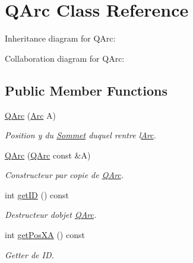 \hypertarget{classQArc}{}\section{Q\+Arc Class Reference}
\label{classQArc}


Inheritance diagram for Q\+Arc\+:


Collaboration diagram for Q\+Arc\+:
\subsection*{Public Member Functions}
\begin{DoxyCompactItemize}
\item 
\hyperlink{classQArc_af544f4b00272253a41bc7e6a927bc30c}{Q\+Arc} (\hyperlink{classArc}{Arc} A)
\begin{DoxyCompactList}\small\item\em Position y du \hyperlink{classSommet}{Sommet} duquel rentre l\textquotesingle{}\hyperlink{classArc}{Arc}. \end{DoxyCompactList}\item 
\hyperlink{classQArc_a6eec002d8041a3fca057a7364cefae85}{Q\+Arc} (\hyperlink{classQArc}{Q\+Arc} const \&A)
\begin{DoxyCompactList}\small\item\em Constructeur par copie de \hyperlink{classQArc}{Q\+Arc}. \end{DoxyCompactList}\item 
\mbox{\label{classQArc_a1dd2f3fe97ac5453f40651a1431468c2}} 
int \hyperlink{classQArc_a1dd2f3fe97ac5453f40651a1431468c2}{get\+ID} () const
\begin{DoxyCompactList}\small\item\em Destructeur d\textquotesingle{}objet \hyperlink{classQArc}{Q\+Arc}. \end{DoxyCompactList}\item 
\mbox{\label{classQArc_aa8e171b97d1e1dbecfd558f6872f8354}} 
int \hyperlink{classQArc_aa8e171b97d1e1dbecfd558f6872f8354}{get\+Pos\+XA} () const
\begin{DoxyCompactList}\small\item\em Getter de ID. \end{DoxyCompactList}\item 
\mbox{\label{classQArc_a988afcae1ba5d9bc9344403eb2303448}} 

\end{DoxyCompactItemize}
